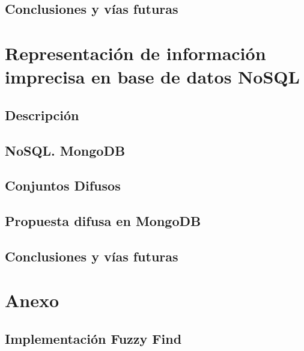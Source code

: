 \documentclass[ oneside,openany,titlepage,numbers=noenddot,headinclude,%
                footinclude=true,cleardoublepage=empty,abstractoff, %
                BCOR=5mm,paper=a4,fontsize=11pt,%
                spanish,american%
                ]{scrreprt}
\begin{document}
\chapter{Conclusiones y vías futuras}


\part{Representación de información imprecisa en base de datos NoSQL}

\chapter{Descripción}




\chapter{NoSQL. MongoDB}


\chapter{Conjuntos Difusos}


\chapter{Propuesta difusa en MongoDB}


\chapter{Conclusiones y vías futuras}


\appendix
\part*{Anexo}
\chapter{Implementación Fuzzy Find}


\cleardoublepage
\end{document}
